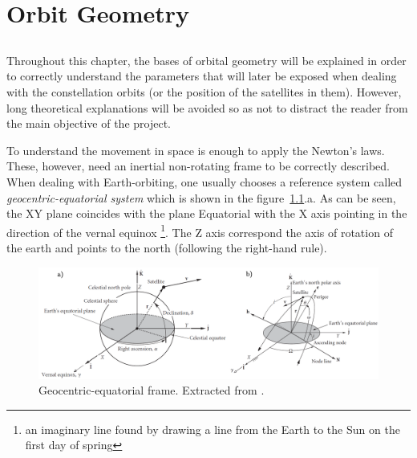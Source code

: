\chapter{Orbit Geometry}


\section*{}
\paragraph{}
Throughout this chapter, the bases of orbital geometry will be explained in order to correctly understand the parameters that will later be exposed when dealing with the constellation orbits (or the position of the satellites in them). However, long theoretical explanations will be avoided so as not to distract the reader from the main objective of the project.

To understand the movement in space is enough to apply the Newton's laws. These, however, need an inertial non-rotating frame to be correctly described. When dealing with Earth-orbiting, one usually chooses a reference system called \textit{geocentric-equatorial system} which is shown in the figure~\ref{fig:eqframe}.a. As can be seen, the XY plane coincides with the plane Equatorial with the X axis pointing in the direction of the vernal equinox \footnote{an imaginary line found by drawing a line from the Earth to the Sun on the first day of spring}. The Z axis correspond the axis of rotation of the earth and points to the north (following the right-hand rule).

\begin{figure}[H]
\centering
\includegraphics[scale=.35]{./Geometry/fig-Ch1-Geometry/COE&eqframe.png}
\caption{Geocentric-equatorial frame. Extracted from \cite{Howard}.}
\label{fig:eqframe}
\end{figure}

